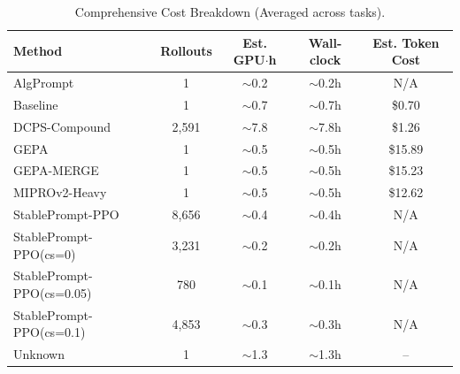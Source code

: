 \begin{table}[h]
\centering
\caption{Comprehensive Cost Breakdown (Averaged across tasks).}
\label{tab:cost_drop}
\begin{tabular}{@{}lcccc@{}}
\toprule
\textbf{Method} & \textbf{Rollouts} & \textbf{Est. GPU$\cdot$h} & \textbf{Wall-clock} & \textbf{Est. Token Cost} \\ \midrule
AlgPrompt & 1 & $\sim$0.2 & $\sim$0.2h & N/A \\
Baseline & 1 & $\sim$0.7 & $\sim$0.7h & \$0.70 \\
DCPS-Compound & 2,591 & $\sim$7.8 & $\sim$7.8h & \$1.26 \\
GEPA & 1 & $\sim$0.5 & $\sim$0.5h & \$15.89 \\
GEPA-MERGE & 1 & $\sim$0.5 & $\sim$0.5h & \$15.23 \\
MIPROv2-Heavy & 1 & $\sim$0.5 & $\sim$0.5h & \$12.62 \\
StablePrompt-PPO & 8,656 & $\sim$0.4 & $\sim$0.4h & N/A \\
StablePrompt-PPO(cs=0) & 3,231 & $\sim$0.2 & $\sim$0.2h & N/A \\
StablePrompt-PPO(cs=0.05) & 780 & $\sim$0.1 & $\sim$0.1h & N/A \\
StablePrompt-PPO(cs=0.1) & 4,853 & $\sim$0.3 & $\sim$0.3h & N/A \\
Unknown & 1 & $\sim$1.3 & $\sim$1.3h & -- \\
\bottomrule
\end{tabular}
\end{table}
